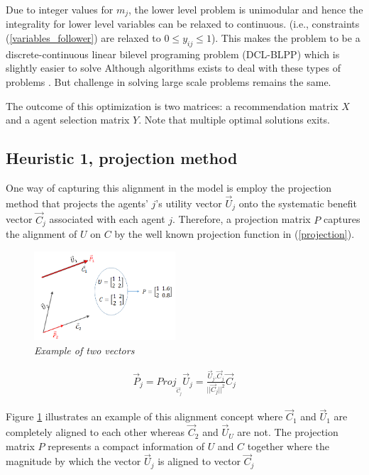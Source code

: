 \documentclass[11pt, letterpaper]{article}
\begin{document}
Due to integer values for $m_j$, the lower level problem is unimodular and hence the integrality for lower level variables can be relaxed to continuous. (i.e., constraints (\ref{variables_follower}) are relaxed to $0\leq y_{ij} \leq 1$). This makes the problem to be a discrete-continuous linear  bilevel programing problem (DCL-BLPP) which is slightly easier to solve Although algorithms exists to deal with these types of problems \cite{bard2013practical}. But challenge in solving large scale problems remains the same.

The outcome of this optimization is two matrices: a recommendation matrix $X$ and a agent selection matrix $Y$. Note that multiple optimal solutions exits.

\subsection{Heuristic 1, projection method}
 One way of capturing this alignment in the model is employ the projection method that projects the agents' $j$'s utility vector $\vec{U}_{j}$ onto the systematic benefit vector $\vec{C}_{j}$ associated with each agent $j$. Therefore, a projection matrix $P$ captures the alignment of $U$ on $C$ by the well known projection function in (\ref{projection}). 

\begin{figure}
\centering
\includegraphics[width=0.47\textwidth]{projection_example.png}
\caption{\emph{Example of two vectors}}   \label{fig:projection}
\end{figure}  
\noindent
\vspace{-.1in}
\begin{align}
\vec{P}_{j}=Proj_{_{\vec{C}_{j}}}\vec{U}_{j}=\frac{\vec{U}_{j}.\vec{C}_{j}}{||\vec{C}_{j}||^2} \vec{C}_{j} \label{projection} 
\end{align}

Figure \ref{fig:projection} illustrates an example of this alignment concept where $\vec{C}_{1}$ and $\vec{U}_{1}$ are completely aligned to each other whereas $\vec{C}_{2}$  and $\vec{U}_{U}$  are not. The projection matrix $P$ represents a compact information of $U$ and $C$ together where the magnitude by which the vector $\vec{U}_{j}$ is aligned to vector $\vec{C}_{j}$
\end{document}
